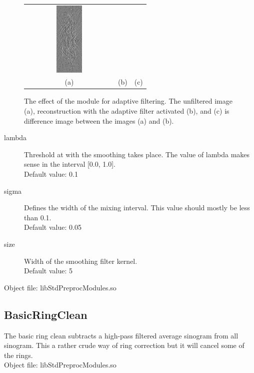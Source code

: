 \documentclass[a4paper]{scrreprt}
\begin{document}
\begin{figure}[ht!]
\begin{tabular}{ccc}
\includegraphics[angle=90, width=0.3\textwidth]{figures/adaptive_diff.png} \\
(a) & (b) & (c)
\end{tabular}
\caption{The effect of the module for adaptive filtering. The unfiltered image (a), reconstruction with the adaptive filter activated (b), and (c) is difference image between the images (a) and (b).}
\end{figure}
\begin{description}
 \item[lambda] Threshold at with the smoothing takes place. The value of lambda
makes sense in the interval [0.0, 1.0]. \\Default value: 0.1
 \item[sigma] Defines the width of the mixing interval. This value should
mostly be less than 0.1. \\Default value: 0.05
 \item[size] Width of the smoothing filter kernel. \\Default value: 5
\end{description}
Object file: libStdPreprocModules.so

\subsection{BasicRingClean}
The basic ring clean subtracts a high-pass filtered average sinogram from all
sinogram. This a rather crude way of ring correction but it will cancel some of
the rings.\\
Object file: libStdPreprocModules.so
\end{document}
